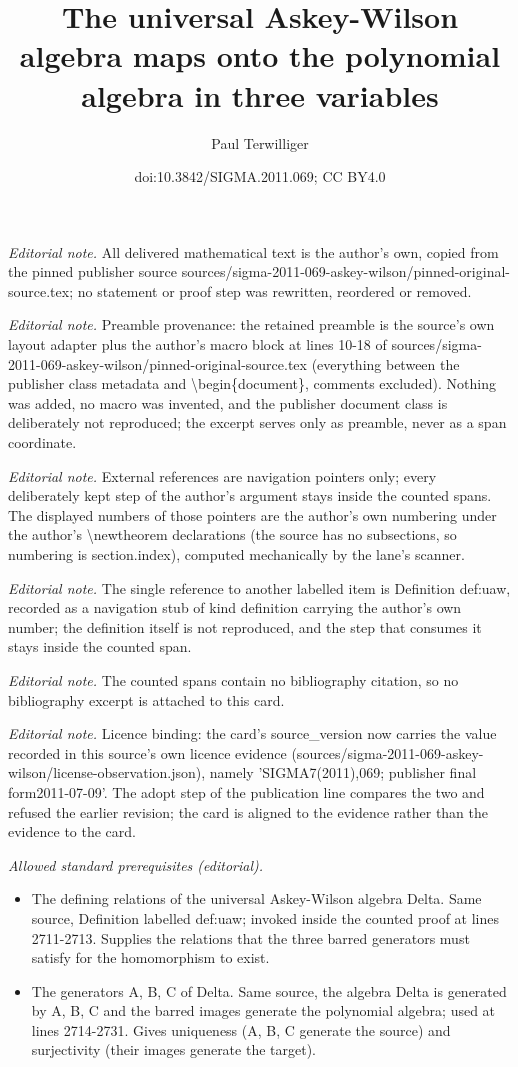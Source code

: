 \documentclass[10pt,a4paper]{amsart}
\title{The universal Askey-Wilson algebra maps onto the polynomial algebra in three variables}
\author{Paul Terwilliger}
\date{doi:10.3842/SIGMA.2011.069; CC BY4.0}
\begin{document}
\maketitle
\noindent\textit{Editorial note.} All delivered mathematical text is the author's own, copied from the pinned publisher source sources/sigma-2011-069-askey-wilson/pinned-original-source.tex; no statement or proof step was rewritten, reordered or removed.\par\medskip
\noindent\textit{Editorial note.} Preamble provenance: the retained preamble is the source's own layout adapter plus the author's macro block at lines 10-18 of sources/sigma-2011-069-askey-wilson/pinned-original-source.tex (everything between the publisher class metadata and \textbackslash{}begin\{document\}, comments excluded). Nothing was added, no macro was invented, and the publisher document class is deliberately not reproduced; the excerpt serves only as preamble, never as a span coordinate.\par\medskip
\noindent\textit{Editorial note.} External references are navigation pointers only; every deliberately kept step of the author's argument stays inside the counted spans. The displayed numbers of those pointers are the author's own numbering under the author's \textbackslash{}newtheorem declarations (the source has no subsections, so numbering is section.index), computed mechanically by the lane's scanner.\par\medskip
\noindent\textit{Editorial note.} The single reference to another labelled item is Definition def:uaw, recorded as a navigation stub of kind definition carrying the author's own number; the definition itself is not reproduced, and the step that consumes it stays inside the counted span.\par\medskip
\noindent\textit{Editorial note.} The counted spans contain no bibliography citation, so no bibliography excerpt is attached to this card.\par\medskip
\noindent\textit{Editorial note.} Licence binding: the card's source\_version now carries the value recorded in this source's own licence evidence (sources/sigma-2011-069-askey-wilson/license-observation.json), namely 'SIGMA7(2011),069; publisher final form2011-07-09'. The adopt step of the publication line compares the two and refused the earlier revision; the card is aligned to the evidence rather than the evidence to the card.\par\medskip
\noindent\textit{Allowed standard prerequisites (editorial).}\begin{itemize}
\item The defining relations of the universal Askey-Wilson algebra Delta. Same source, Definition labelled def:uaw; invoked inside the counted proof at lines 2711-2713. Supplies the relations that the three barred generators must satisfy for the homomorphism to exist.
\item The generators A, B, C of Delta. Same source, the algebra Delta is generated by A, B, C and the barred images generate the polynomial algebra; used at lines 2714-2731. Gives uniqueness (A, B, C generate the source) and surjectivity (their images generate the target).
\end{itemize}\medskip
\end{document}
